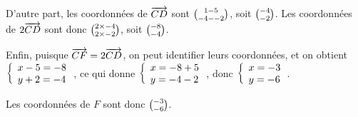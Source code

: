 \documentclass[12pt]{article}
\begin{document}
\begin{exercice}
\begin{enumerate}
\begin{enumerate}
      D'autre part, les coordonnées de $\overrightarrow{CD}$ sont $\binom{1-5}{-4--2}$, soit $\binom{-4}{-2}$. Les coordonnées de $2\overrightarrow{CD}$ sont donc $\binom{2\times-4}{2\times-2}$, soit $\binom{-8}{-4}$.

      Enfin, puisque $\overrightarrow{CF}=2\overrightarrow{CD}$, on peut identifier leurs coordonnées, et on obtient $\left\{\begin{array}{l}x-5=-8\\y+2=-4\end{array}\right.$, ce qui donne $\left\{\begin{array}{l}x=-8+5\\y=-4-2\end{array}\right.$, donc $\left\{\begin{array}{l}x=-3\\y=-6\end{array}\right.$.

      Les coordonnées de $F$ sont donc $\binom{-3}{-6}$.
  \end{enumerate}
  \end{enumerate}
\end{exercice}
\end{document}
